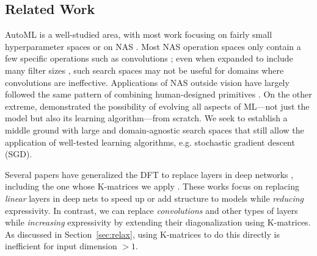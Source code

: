 
\subsection{Related Work}

AutoML is a well-studied area, with most work focusing on fairly small hyperparameter spaces \citep{bergstra2012rs,li2018hyperband} or on NAS \citep{elsken2019nas}.
Most NAS operation spaces only contain a few specific operations such as convolutions \citep{liu2019darts,zela2020nasbench1shot1,dong2020nasbench201};
even when expanded to include many filter sizes \citep{mei2020atomnas}, such search spaces may not be useful for domains where convolutions are ineffective.
Applications of NAS outside vision have largely followed the same pattern of combining human-designed primitives \citep{nekrasov2019nas,wang2020textnas}. 
On the other extreme, \citet{real2020automlzero} demonstrated the possibility of evolving all aspects of ML---not just the model but also its learning algorithm---from scratch.
We seek to establish a middle ground with large and domain-agnostic search spaces that still allow the application of well-tested learning algorithms, e.g. stochastic gradient descent (SGD).

Several papers have generalized the DFT to replace layers in deep networks \citep{dao2019butterfly,alizadeh2020butterfly,ailon2020butterfly}, including the one whose K-matrices we apply \cite{dao2020kaleidoscope}.
These works focus on replacing {\em linear} layers in deep nets to speed up or add structure to models while {\em reducing} expressivity.
In contrast, we can replace {\em convolutions} and other types of layers while {\em increasing} expressivity by extending their diagonalization using K-matrices.
As discussed in Section~\ref{sec:relax}, using K-matrices to do this directly is inefficient for input dimension $>1$.


